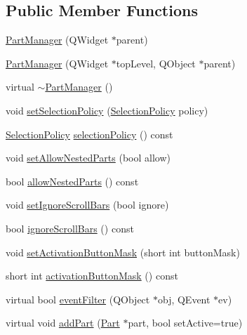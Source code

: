 \subsection*{Public Member Functions}
\begin{DoxyCompactItemize}
\item 
\hyperlink{classKParts_1_1PartManager_ad46e63f77ab7dc553f189f7078fee8c8}{Part\+Manager} (Q\+Widget $\ast$parent)
\item 
\hyperlink{classKParts_1_1PartManager_a549d5b81307465317130047f3ffeb92c}{Part\+Manager} (Q\+Widget $\ast$top\+Level, Q\+Object $\ast$parent)
\item 
virtual \hyperlink{classKParts_1_1PartManager_ac5a751da0f9ca33698b2e2e9d0e5a8d1}{$\sim$\+Part\+Manager} ()
\item 
void \hyperlink{classKParts_1_1PartManager_a1b9382654eab488363d5f96364dee7ec}{set\+Selection\+Policy} (\hyperlink{classKParts_1_1PartManager_a7db25fb7e7f91548fa15566b3af4bb34}{Selection\+Policy} policy)
\item 
\hyperlink{classKParts_1_1PartManager_a7db25fb7e7f91548fa15566b3af4bb34}{Selection\+Policy} \hyperlink{classKParts_1_1PartManager_a8bf881c3df8e6993e228d4cc63e600f1}{selection\+Policy} () const 
\item 
void \hyperlink{classKParts_1_1PartManager_a141f0dc6283775ecd64a9098b434f7dd}{set\+Allow\+Nested\+Parts} (bool allow)
\item 
bool \hyperlink{classKParts_1_1PartManager_afd5a6425e74a5199ece97a1fc52375b3}{allow\+Nested\+Parts} () const 
\item 
void \hyperlink{classKParts_1_1PartManager_a83d83a92c295bc560166f9f3d7042919}{set\+Ignore\+Scroll\+Bars} (bool ignore)
\item 
bool \hyperlink{classKParts_1_1PartManager_ac92933cad3010594b6572b7e680f39e0}{ignore\+Scroll\+Bars} () const 
\item 
void \hyperlink{classKParts_1_1PartManager_a1f7d9cd024ca16b2536e8fb415490932}{set\+Activation\+Button\+Mask} (short int button\+Mask)
\item 
short int \hyperlink{classKParts_1_1PartManager_ac17b67e82fd11a3c59476c2724c9b489}{activation\+Button\+Mask} () const 
\item 
virtual bool \hyperlink{classKParts_1_1PartManager_a7c8b0609da38332cbe2675fff6502e6e}{event\+Filter} (Q\+Object $\ast$obj, Q\+Event $\ast$ev)
\item 
virtual void \hyperlink{classKParts_1_1PartManager_afe85fcc6ec3dbcb401a66c1bf24391e5}{add\+Part} (\hyperlink{classKParts_1_1Part}{Part} $\ast$part, bool set\+Active=true)

\end{DoxyCompactItemize}
